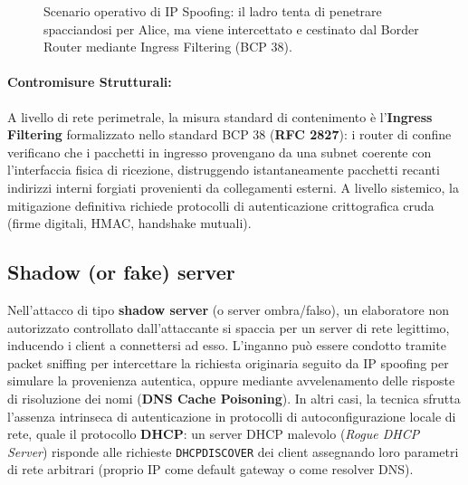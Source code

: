 \documentclass[../../main.tex]{subfiles}
\begin{document}
\begin{figure}[htbp]
{%
}
\caption{Scenario operativo di IP Spoofing: il ladro tenta di penetrare spacciandosi per Alice, ma viene intercettato e cestinato dal Border Router mediante Ingress Filtering (BCP 38).}
\label{fig:ip_spoofing}
\end{figure}

\paragraph{Contromisure Strutturali:}
A livello di rete perimetrale, la misura standard di contenimento è l'\textbf{Ingress Filtering} formalizzato nello standard BCP 38 (\textbf{RFC 2827}): i router di confine verificano che i pacchetti in ingresso provengano da una subnet coerente con l'interfaccia fisica di ricezione, distruggendo istantaneamente pacchetti recanti indirizzi interni forgiati provenienti da collegamenti esterni. A livello sistemico, la mitigazione definitiva richiede protocolli di autenticazione crittografica cruda (firme digitali, HMAC, handshake mutuali).

\subsection{Shadow (or fake) server}
\label{subsec:shadow_server}

Nell'attacco di tipo \textbf{shadow server} (o server ombra/falso), un elaboratore non autorizzato controllato dall'attaccante si spaccia per un server di rete legittimo, inducendo i client a connettersi ad esso. L'inganno può essere condotto tramite packet sniffing per intercettare la richiesta originaria seguito da IP spoofing per simulare la provenienza autentica, oppure mediante avvelenamento delle risposte di risoluzione dei nomi (\textbf{DNS Cache Poisoning}). In altri casi, la tecnica sfrutta l'assenza intrinseca di autenticazione in protocolli di autoconfigurazione locale di rete, quale il protocollo \textbf{DHCP}: un server DHCP malevolo (\textit{Rogue DHCP Server}) risponde alle richieste \texttt{DHCPDISCOVER} dei client assegnando loro parametri di rete arbitrari (proprio IP come default gateway o come resolver DNS).
\end{document}
